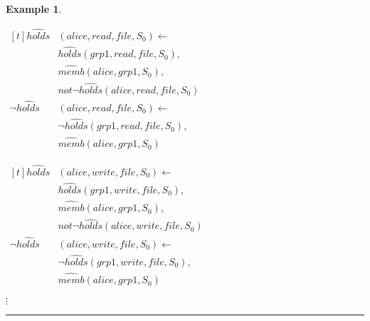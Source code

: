 \documentclass[10pt, twocolumn]{article}
\newtheorem{examp}{Example}
\newenvironment{example}{\begin{examp}\rm}{\rule{2mm}{2mm}\end{examp}}
\begin{document}
\begin{example}
\begin{enumerate}
              \begin{math}
                \begin{aligned}[t]
                  \hat{holds}&(alice, read, file, S_{0}) \leftarrow \\
                  & \hat{holds}(grp1, read, file, S_{0}), \\
                  & \hat{memb}(alice, grp1, S_{0}), \\
                  & not \lnot \hat{holds}(alice, read, file, S_{0}) \\
                  \lnot \hat{holds}&(alice, read, file, S_{0}) \leftarrow \\
                  & \lnot \hat{holds}(grp1, read, file, S_{0}), \\
                  & \hat{memb}(alice, grp1, S_{0})
                \end{aligned}
              \end{math}

              \begin{math}
                \begin{aligned}[t]
                  \hat{holds}&(alice, write, file, S_{0}) \leftarrow \\
                  & \hat{holds}(grp1, write, file, S_{0}), \\
                  & \hat{memb}(alice, grp1, S_{0}), \\
                  & not \lnot \hat{holds}(alice, write, file, S_{0}) \\
                  \lnot \hat{holds}&(alice, write, file, S_{0}) \leftarrow \\
                  & \lnot \hat{holds}(grp1, write, file, S_{0}), \\
                  & \hat{memb}(alice, grp1, S_{0})
                \end{aligned}
              \end{math}

              \hspace{1cm} $\vdots$


\end{enumerate}
\end{example}
\end{document}
